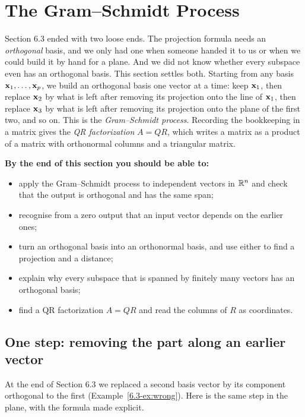 \documentclass[11pt]{article}
\begin{document}
\section{The Gram--Schmidt Process}

\begin{guide}
Section 6.3 ended with two loose ends. The projection formula needs an \emph{orthogonal} basis, and we only had one when someone handed it to us or when we could build it by hand for a plane. And we did not know whether every subspace even has an orthogonal basis. This section settles both. Starting from any basis $\mathbf{x}_1,\dots,\mathbf{x}_p$, we build an orthogonal basis one vector at a time: keep $\mathbf{x}_1$, then replace $\mathbf{x}_2$ by what is left after removing its projection onto the line of $\mathbf{x}_1$, then replace $\mathbf{x}_3$ by what is left after removing its projection onto the plane of the first two, and so on. This is the \emph{Gram--Schmidt process}. Recording the bookkeeping in a matrix gives the \emph{QR factorization} $A=QR$, which writes a matrix as a product of a matrix with orthonormal columns and a triangular matrix.
\end{guide}

\textbf{By the end of this section you should be able to:}
\begin{itemize}
  \item apply the Gram--Schmidt process to independent vectors in $\mathbb{R}^n$ and check that the output is orthogonal and has the same span;
  \item recognise from a zero output that an input vector depends on the earlier ones;
  \item turn an orthogonal basis into an orthonormal basis, and use either to find a projection and a distance;
  \item explain why every subspace that is spanned by finitely many vectors has an orthogonal basis;
  \item find a QR factorization $A=QR$ and read the columns of $R$ as coordinates.
\end{itemize}

\subsection*{One step: removing the part along an earlier vector}

At the end of Section 6.3 we replaced a second basis vector by its component orthogonal to the first (Example~\ref{6.3-ex:wrong}). Here is the same step in the plane, with the formula made explicit.
\end{document}
